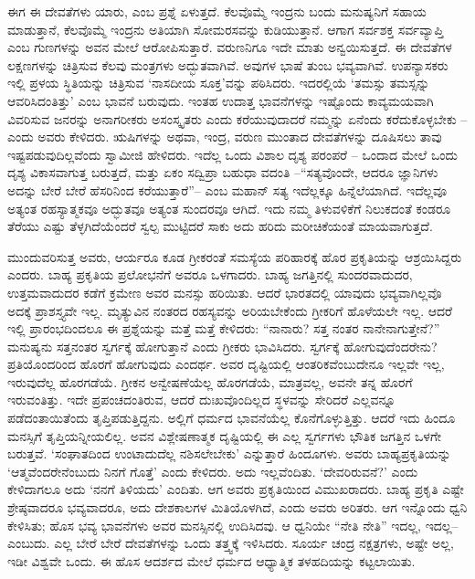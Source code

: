 ಈಗ ಈ ದೇವತೆಗಳು ಯಾರು, ಎಂಬ ಪ್ರಶ್ನೆ ಏಳುತ್ತದೆ. ಕೆಲವೊಮ್ಮೆ ಇಂದ್ರನು ಬಂದು ಮನುಷ್ಯನಿಗೆ ಸಹಾಯ ಮಾಡುತ್ತಾನೆ, ಕೆಲವೊಮ್ಮೆ ಇಂದ್ರನು ಅತಿಯಾಗಿ ಸೋಮರಸವನ್ನು ಕುಡಿಯುತ್ತಾನೆ. ಆಗಾಗ ಸರ್ವಶಕ್ತ ಸರ್ವವ್ಯಾಪ್ತಿ ಎಂಬ ಗುಣಗಳನ್ನು ಅವನ ಮೇಲೆ ಆರೋಪಿಸುತ್ತಾರೆ. ವರುಣನಿಗೂ ಇದೇ ಮಾತು ಅನ್ವಯಿಸುತ್ತದೆ. ಈ ದೇವತೆಗಳ ಲಕ್ಷಣಗಳನ್ನು ಚಿತ್ರಿಸುವ ಕೆಲವು ಮಂತ್ರಗಳು ಅದ್ಭುತವಾಗಿವೆ. ಅವುಗಳ ಭಾಷೆ ತುಂಬ ಭವ್ಯವಾಗಿವೆ. ಉಪನ್ಯಾಸಕರು ಇಲ್ಲಿ ಪ್ರಳಯ ಸ್ಥಿತಿಯನ್ನು ಚಿತ್ರಿಸುವ ‘ನಾಸದೀಯ ಸೂಕ್ತ’ವನ್ನು ಪಠಿಸಿದರು. ಇದರಲ್ಲಿಯೆ ‘ತಮಸ್ಸು ತಮಸ್ಸನ್ನು ಆವರಿಸಿದಂತಿತ್ತು’ ಎಂಬ ಭಾವನೆ ಬರುವುದು. ಇಂತಹ ಉದಾತ್ತ ಭಾವನೆಗಳನ್ನು ಇಷ್ಟೊಂದು ಕಾವ್ಯಮಯವಾಗಿ ವಿವರಿಸುವ ಜನರನ್ನು ಅನಾಗರೀಕರು ಅಸಂಸ್ಕೃತರು ಎಂದು ಕರೆಯುವುದಾದರೆ ನಮ್ಮನ್ನು ಏನೆಂದು ಕರೆದುಕೊಳ್ಳಬೇಕು – ಎಂದು ಅವರು ಕೇಳಿದರು. ಋಷಿಗಳನ್ನು ಅಥವಾ, ಇಂದ್ರ, ವರುಣ ಮುಂತಾದ ದೇವತೆಗಳನ್ನು ದೂಷಿಸಲು ತಾವು ಇಷ್ಟಪಡುವುದಿಲ್ಲವೆಂದು ಸ್ವಾಮೀಜಿ ಹೇಳಿದರು. ಇದೆಲ್ಲ ಒಂದು ವಿಶಾಲ ದೃಶ್ಯ ಪರಂಪರೆ – ಒಂದಾದ ಮೇಲೆ ಒಂದು ದೃಶ್ಯ ವಿಕಾಸವಾಗುತ್ತ ಬರುತ್ತದೆ, ಮತ್ತು ಏಕಂ ಸದ್ವಿಪ್ರಾ ಬಹುಧಾ ವದಂತಿ –“ಸತ್ಯವೊಂದೇ, ಆದರೂ ಜ್ಞಾನಿಗಳು ಅದನ್ನು ಬೇರೆ ಬೇರೆ ಹೆಸರಿನಿಂದ ಕರೆಯುತ್ತಾರೆ”– ಎಂಬ ಮಹಾನ್​ ಸತ್ಯ ಇದೆಲ್ಲಕ್ಕೂ ಹಿನ್ನೆಲೆಯಾಗಿದೆ. ಇದೆಲ್ಲವೂ ಅತ್ಯಂತ ರಹಸ್ಯಾತ್ಮಕವೂ ಅದ್ಭುತವೂ ಅತ್ಯಂತ ಸುಂದರವೂ ಆಗಿದೆ. ಇದು ನಮ್ಮ ತಿಳುವಳಿಕೆಗೆ ನಿಲುಕದಂತೆ ಕಂಡರೂ ತೆರೆಯು ಎಷ್ಟು ತೆಳ್ಳಗಿದೆಯೆಂದರೆ ಸ್ವಲ್ಪ ಮುಟ್ಟಿದರೆ ಸಾಕು ಅದು ಹರಿದು ಮರೀಚಿಕೆಯಂತೆ ಮಾಯವಾಗುತ್ತದೆ. 

ಮುಂದುವರಿಸುತ್ತ ಅವರು, ಆರ್ಯರೂ ಕೂಡ ಗ್ರೀಕರಂತೆ ಸಮಸ್ಯೆಯ ಪರಿಹಾರಕ್ಕೆ ಹೊರ ಪ್ರಕೃತಿಯನ್ನು ಆಶ್ರಯಿಸಿದ್ದರು ಎಂದರು. ಬಾಹ್ಯ ಪ್ರಕೃತಿಯ ಪ್ರಲೋಭನೆಗೆ ಅವರೂ ಒಳಗಾದರು. ಬಾಹ್ಯ ಜಗತ್ತಿನಲ್ಲಿ ಸುಂದರವಾದುದರ, ಉತ್ತಮವಾದುದರ ಕಡೆಗೆ ಕ್ರಮೇಣ ಅವರ ಮನಸ್ಸು ಹರಿಯಿತು. ಆದರೆ ಭಾರತದಲ್ಲಿ ಯಾವುದು ಭವ್ಯವಾಗಿಲ್ಲವೊ ಅದಕ್ಕೆ ಪ್ರಾಶಸ್ತ್ಯವೇ ಇಲ್ಲ. ಮೃತ್ಯುವಿನ ನಂತರದ ರಹಸ್ಯವನ್ನು ಅರಿಯಬೇಕೆಂದು ಗ್ರೀಕರಿಗೆ ಹೊಳೆಯಲೇ ಇಲ್ಲ. ಆದರೆ ಇಲ್ಲಿ ಪ್ರಾರಂಭದಿಂದಲೂ ಈ ಪ್ರಶ್ನೆಯನ್ನು ಮತ್ತೆ ಮತ್ತೆ ಕೇಳಿದರು: “ನಾನಾರು? ಸತ್ತ ನಂತರ ನಾನೇನಾಗುತ್ತೇನೆ?” ಮನುಷ್ಯನು ಸತ್ತನಂತರ ಸ್ವರ್ಗಕ್ಕೆ ಹೋಗುತ್ತಾನೆ ಎಂದು ಗ್ರೀಕರು ಭಾವಿಸಿದರು. ಸ್ವರ್ಗಕ್ಕೆ ಹೋಗುವುದೆಂದರೇನು? ಪ್ರತಿಯೊಂದರಿಂದ ಹೊರಗೆ ಹೋಗುವುದು ಎಂದರ್ಥ. ಅವರ ದೃಷ್ಟಿಯಲ್ಲಿ ಆಂತರಿಕವೆಂಬುದೇನೂ ಇಲ್ಲವೇ ಇಲ್ಲ, ಇರುವುದೆಲ್ಲ ಹೊರಗಡೆಯೆ. ಗ್ರೀಕನ ಅನ್ವೇಷಣೆಯೆಲ್ಲ ಹೊರಗಡೆಯೆ, ಮಾತ್ರವಲ್ಲ, ಅವನೇ ತನ್ನ ಹೊರಗೆ ಇರುವಂತಿತ್ತು. ಇದೇ ಪ್ರಪಂಚದಂತಿರುವ, ಆದರೆ ದುಃಖವೊಂದಿಲ್ಲದ ಸ್ಥಳವನ್ನು ಸೇರಿದರೆ ಎಲ್ಲವನ್ನೂ ಪಡೆದಂತಾಯಿತೆಂದು ತೃಪ್ತಿಪಡುತ್ತಿದ್ದನು. ಅಲ್ಲಿಗೆ ಧರ್ಮದ ಭಾವನೆಯೆಲ್ಲ ಕೊನೆಗೊಳ್ಳುತ್ತಿತ್ತು. ಆದರೆ ಇದು ಹಿಂದೂ ಮನಸ್ಸಿಗೆ ತೃಪ್ತಿಯನ್ನೀಯಲಿಲ್ಲ. ಅವನ ವಿಶ್ಲೇಷಣಾತ್ಮಕ ದೃಷ್ಟಿಯಲ್ಲಿ ಈ ಎಲ್ಲ ಸ್ವರ್ಗಗಳು ಭೌತಿಕ ಜಗತ್ತಿನ ಒಳಗೇ ಬರುತ್ತವೆ. ‘ಸಂಘಾತದಿಂದ ಉಂಟಾದುದೆಲ್ಲ ನಶಿಸಲೇಬೇಕು’ ಎನ್ನುತ್ತಾರೆ ಹಿಂದೂಗಳು. ಅವರು ಬಾಹ್ಯಪ್ರಕೃತಿಯನ್ನು ‘ಆತ್ಮವೆಂದರೇನೆಂಬುದು ನಿನಗೆ ಗೊತ್ತೆ’ ಎಂದು ಕೇಳಿದರು. ಅದು ಇಲ್ಲವೆಂದಿತು. ‘ದೇವರಿರುವನೆ?’ ಎಂದು ಕೇಳಿದಾಗಲೂ ಅದು ‘ನನಗೆ ತಿಳಿಯದು’ ಎಂದಿತು. ಆಗ ಅವರು ಪ್ರಕೃತಿಯಿಂದ ವಿಮುಖರಾದರು. ಬಾಹ್ಯ ಪ್ರಕೃತಿ ಎಷ್ಟೇ ಶ್ರೇಷ್ಠವಾದರೂ ಭವ್ಯವಾದರೂ, ಅದು ದೇಶಕಾಲಗಳ ಮಿತಿಯೊಳಗಿದೆ, ಎಂದು ಅವರು ಅರಿತರು. ಆಗ ಇನ್ನೊಂದು ಧ್ವನಿ ಕೇಳಿಸಿತು; ಹೊಸ ಭವ್ಯ ಭಾವನೆಗಳು ಅವರ ಮನಸ್ಸಿನಲ್ಲಿ ಉದಿಸಿದವು. ಆ ಧ್ವನಿಯೇ “ನೇತಿ ನೇತಿ” ಇದಲ್ಲ, ಇದಲ್ಲ– ಎಂಬುದು. ಎಲ್ಲ ಬೇರೆ ಬೇರೆ ದೇವತೆಗಳನ್ನು ಒಂದು ತತ್ತ್ವಕ್ಕೆ ಇಳಿಸಿದರು. ಸೂರ್ಯ ಚಂದ್ರ ನಕ್ಷತ್ರಗಳು, ಅಷ್ಟೇ ಅಲ್ಲ, ಇಡೀ ವಿಶ್ವವೇ ಒಂದು. ಈ ಹೊಸ ಆದರ್ಶದ ಮೇಲೆ ಧರ್ಮದ ಆಧ್ಯಾತ್ಮಿಕ ತಳಹದಿಯನ್ನು ಕಟ್ಟಲಾಯಿತು.

